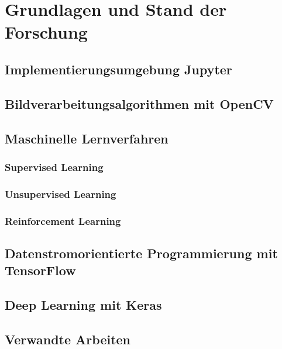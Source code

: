 \chapter{Grundlagen und Stand der Forschung}


\section{Implementierungsumgebung Jupyter}

\section{Bildverarbeitungsalgorithmen mit OpenCV}

\section{Maschinelle Lernverfahren}

\subsection{Supervised Learning}

\subsection{Unsupervised Learning}

\subsection{Reinforcement Learning}

\section{Datenstromorientierte Programmierung mit TensorFlow}

\section{Deep Learning mit Keras}

\section{Verwandte Arbeiten}
